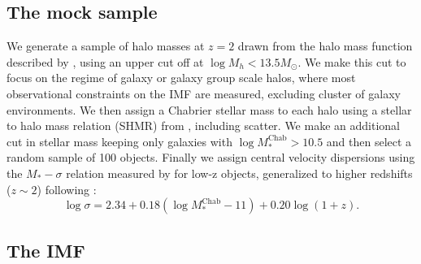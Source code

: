 \documentclass[usenatbib, letters]{mnras}
\def\mchab{M_*^{\mathrm{Chab}}}
\begin{document}
\subsection{The mock sample}

We generate a sample of halo masses at $z=2$ drawn from the halo mass function described by \citet{Tin++08}, using an upper cut off at $\log{M_h} < 13.5M_\odot$.
We make this cut to focus on the regime of galaxy or galaxy group scale halos, where most observational constraints on the IMF are measured, excluding cluster of galaxy environments.
We then assign a Chabrier stellar mass to each halo using a stellar to halo mass relation (SHMR) from \citet{Lea++12}, including scatter.
We make an additional cut in stellar mass keeping only galaxies with $\log{\mchab} > 10.5$ and then select a random sample of 100 objects.
Finally we assign central velocity dispersions using the $M_*-\sigma$ relation measured by \citet{Aug++10} for low-z objects, generalized to higher redshifts ($z \sim 2$) following \citet{Mas++15}:
\begin{equation}\label{eq:mason}
\log{\sigma} = 2.34 + 0.18(\log{\mchab} - 11) + 0.20\log{(1 + z)}.
\end{equation}



\subsection{The IMF}
\label{ssect:imfform}
\end{document}

